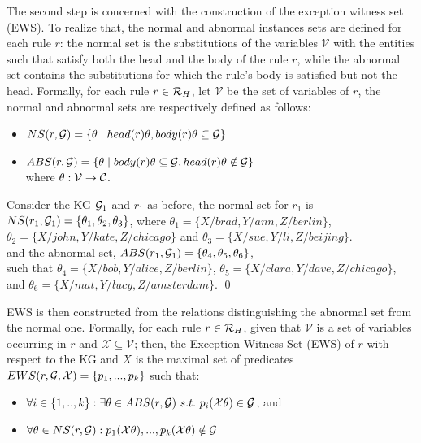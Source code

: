 The second step is concerned with the construction of the exception witness set (EWS). To realize that, the normal and abnormal instances sets are defined for each rule $r$: the normal set is the substitutions of the variables $\mathcal{V}$ with the entities such that satisfy both the head and the body of the rule $r$, while the abnormal set contains the  substitutions for which the rule's  body is satisfied but not the head.
Formally, for each rule $r \in \mathcal{R}_H$, let $\mathcal{V}$ be the set of variables of $r$, the normal and abnormal sets are respectively defined as follows:
\begin{itemize}
\item $NS(r, \mathcal{G}) = \{\theta \mid head(r)\theta, body(r)\theta \subseteq \mathcal{G}\}$
\item $ABS(r, \mathcal{G}) = \{\theta \mid body(r)\theta \subseteq \mathcal{G} , head(r)\theta \notin \mathcal{G}\}$\\
where $\theta: \mathcal{V} \rightarrow \mathcal{C}$.
\end{itemize}

\begin{example}
Consider the KG $\mathcal{G}_1$ and $r_1$ as before, the normal set for $r_1$ is $NS(r_1,\mathcal{G}_1)=\{\theta_1, \theta_2 ,\theta_3\}$, where $\theta_1 = \{X/brad, Y/ann, Z/berlin\}$,\\  $\theta_2 = \{X/john, Y/kate, Z/chicago\}$ and $\theta_3 = \{X/sue, Y/li, Z/beijing\}$.\\ and the abnormal set, $ABS(r_1,\mathcal{G}_1)=\{\theta_4,\theta_5, \theta_6\}$, \\such that $\theta_4=\{X/bob, Y/alice, Z/berlin\}$,  $\theta_5=\{X/clara, Y/dave, Z/chicago\}$, and $\theta_6=\{X/mat, Y/lucy, Z/amsterdam\}$.
\qed
\end{example}

EWS is then constructed from the relations distinguishing the abnormal set from the normal one. Formally, for each rule $r \in \mathcal{R}_H$, given that $\mathcal{V}$ is a set of variables occurring in $r$ and $\mathcal{X} \subseteq \mathcal{V}$; then, the Exception Witness Set (EWS) of $r$ with respect to the KG and $X$ is  the maximal set of predicates $EWS(r,\mathcal{G},\mathcal{X}) = \{p_1,...,p_k\}$ such that:
\begin{itemize}
\item $\forall i \in \{1,..,k\} : \exists \theta \in ABS(r, \mathcal{G})\ s.t.\ p_i(\mathcal{X}\theta) \in \mathcal{G}$, and 
\item $\forall \theta \in NS(r,\mathcal{G}) :  p_1(\mathcal{X}\theta), ...,p_k(\mathcal{X}\theta) \notin \mathcal{G}$
\end{itemize}

